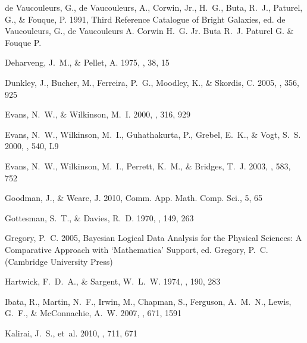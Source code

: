 \documentclass[preprint]{aastex}
\begin{document}
\begin{thebibliography}{}
{de Vaucouleurs}, G., {de Vaucouleurs}, A., {Corwin}, Jr., H.~G., {Buta},
  R.~J., {Paturel}, G., \& {Fouque}, P. 1991, {Third Reference Catalogue of
  Bright Galaxies}, ed. {de Vaucouleurs, G., de Vaucouleurs A. Corwin H.~G. Jr.
  Buta R.~J. Paturel G. \& Fouque P.}

{Deharveng}, J.~M., \& {Pellet}, A. 1975, \aap, 38, 15

{Dunkley}, J., {Bucher}, M., {Ferreira}, P.~G., {Moodley}, K., \& {Skordis}, C.
  2005, \mnras, 356, 925

{Evans}, N.~W., \& {Wilkinson}, M.~I. 2000, \mnras, 316, 929

{Evans}, N.~W., {Wilkinson}, M.~I., {Guhathakurta}, P., {Grebel}, E.~K., \&
  {Vogt}, S.~S. 2000, \apjl, 540, L9

{Evans}, N.~W., {Wilkinson}, M.~I., {Perrett}, K.~M., \& {Bridges}, T.~J. 2003,
  \apj, 583, 752

Goodman, J., \& Weare, J. 2010, Comm. App. Math. Comp. Sci., 5, 65

{Gottesman}, S.~T., \& {Davies}, R.~D. 1970, \mnras, 149, 263

{Gregory}, P.~C. 2005, {Bayesian Logical Data Analysis for the Physical
  Sciences: A Comparative Approach with `Mathematica' Support}, ed. {Gregory,
  P.~C.} (Cambridge University Press)

{Hartwick}, F.~D.~A., \& {Sargent}, W.~L.~W. 1974, \apj, 190, 283

{Ibata}, R., {Martin}, N.~F., {Irwin}, M., {Chapman}, S., {Ferguson}, A.~M.~N.,
  {Lewis}, G.~F., \& {McConnachie}, A.~W. 2007, \apj, 671, 1591

{Kalirai}, J.~S., {et~al.} 2010, \apj, 711, 671


\end{thebibliography}
\end{document}
